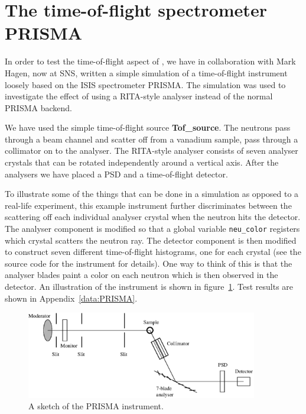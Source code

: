 \section{The time-of-flight spectrometer PRISMA}
\label{s:PRISMA} 

In order to test the time-of-flight aspect of \MCS, we have
in collaboration with Mark Hagen, now at SNS, written a simple
simulation of a time-of-flight instrument loosely based on the ISIS
spectrometer PRISMA. The simulation was used to investigate the effect
of using a RITA-style analyser instead of the normal PRISMA backend.

We have used the simple time-of-flight source {\bf Tof\_source}. 
The neutrons pass through a
beam channel and scatter off from a vanadium sample, pass through
a collimator on to the analyser.
The RITA-style analyser consists of seven analyser crystals
that can be rotated independently around a vertical axis. After the
analysers we have placed a PSD and a time-of-flight detector.

To illustrate some of the things that can be done in a simulation as
opposed to a real-life experiment, this example instrument further
discriminates between
the scattering off each individual analyser crystal 
when the neutron hits the detector. The
analyser component is modified so that a global variable 
\verb+neu_color+ registers which 
crystal scatters the neutron ray. The detector component
is then modified to construct seven different time-of-flight histograms,
one for each crystal (see the source code for the instrument  
for details). One way to think of this is that
the analyser blades paint a color on each neutron which is then
observed in the detector.
An illustration of the instrument is shown in figure~\ref{f:PRISMA}.
Test results are shown in Appendix~\ref{data:PRISMA}.

\begin{figure}[h]
  \begin{center}
    \includegraphics[width=0.9\textwidth]{figures/prisma2.eps}
  \end{center}
\caption{A sketch of the PRISMA instrument.}
\label{f:PRISMA}
\end{figure}

